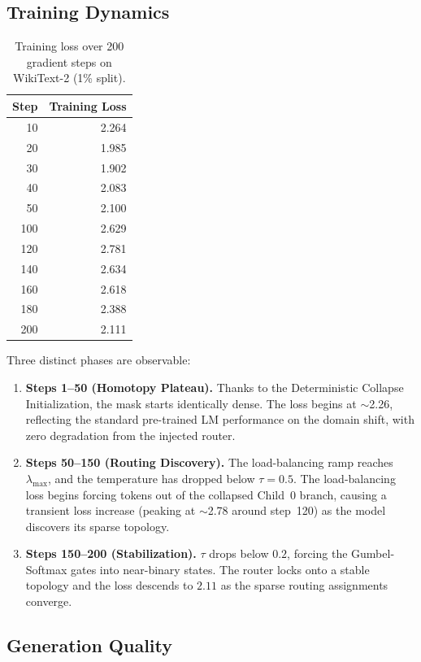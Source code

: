 \documentclass[11pt,a4paper]{article}
\begin{document}
\subsection{Training Dynamics}

\begin{table}[h]
\centering
\caption{Training loss over 200 gradient steps on WikiText-2 (1\% split).}
\label{tab:training}
\begin{tabular}{@{}rr@{}}
\toprule
Step & Training Loss \\
\midrule
10   & 2.264 \\
20   & 1.985 \\
30   & 1.902 \\
40   & 2.083 \\
50   & 2.100 \\
100  & 2.629 \\
120  & 2.781 \\
140  & 2.634 \\
160  & 2.618 \\
180  & 2.388 \\
200  & 2.111 \\
\bottomrule
\end{tabular}
\end{table}

Three distinct phases are observable:

\begin{enumerate}
    \item \textbf{Steps 1--50 (Homotopy Plateau).} Thanks to the Deterministic Collapse Initialization, the mask starts identically dense. The loss begins at $\sim$2.26, reflecting the standard pre-trained LM performance on the domain shift, with zero degradation from the injected router.
    \item \textbf{Steps 50--150 (Routing Discovery).} The load-balancing ramp reaches $\lambda_{\max}$, and the temperature has dropped below $\tau = 0.5$. The load-balancing loss begins forcing tokens out of the collapsed Child~0 branch, causing a transient loss increase (peaking at $\sim$2.78 around step~120) as the model discovers its sparse topology.
    \item \textbf{Steps 150--200 (Stabilization).} $\tau$ drops below $0.2$, forcing the Gumbel-Softmax gates into near-binary states. The router locks onto a stable topology and the loss descends to $2.11$ as the sparse routing assignments converge.
\end{enumerate}

\subsection{Generation Quality}
\end{document}

